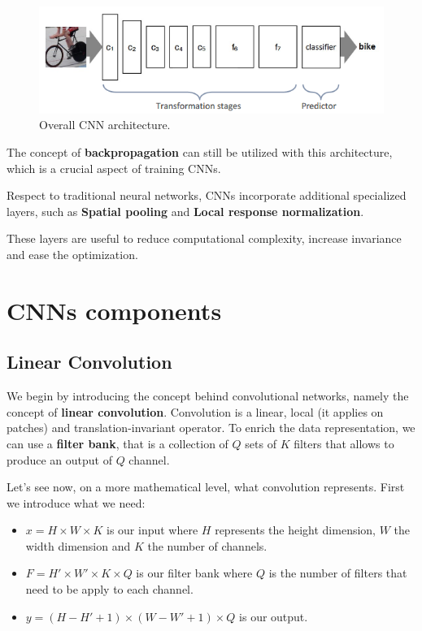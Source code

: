 \begin{figure}[!ht]
    \centering
    \includegraphics[width=\linewidth]{img/CNN/CNNarc.png}
    \caption{Overall CNN architecture.}
    \label{fig:cnnarc}
\end{figure}

The concept of \textbf{backpropagation} can still be utilized with this
architecture, which is a crucial aspect of training CNNs.

Respect to traditional neural networks, CNNs incorporate additional specialized
layers, such as \textbf{Spatial pooling} and \textbf{Local response normalization}.

These layers are useful to reduce computational complexity, increase invariance
and ease the optimization.
\section{CNNs components}
\subsection{Linear Convolution}
We begin by introducing the concept behind convolutional networks, namely the
concept of \textbf{linear convolution}. Convolution is a linear, local
(it applies on patches) and translation-invariant operator. To enrich the data
representation, we can use a \textbf{filter bank}, that is a collection of $Q$
sets of $K$ filters that allows to produce an output of $Q$ channel.

Let's see now, on a more mathematical level, what convolution represents. First we
introduce what we need:
\begin{itemize}
    \item $x = H \times W \times K$ is our input where $H$ represents the height
          dimension, $W$ the width dimension and $K$ the number of channels.
    \item $F = H' \times W' \times K \times Q$ is our filter bank where $Q$ is
          the number of filters that need to be apply to each channel.
    \item $y = (H - H' + 1) \times (W - W' + 1) \times Q$ is our output.
\end{itemize}


